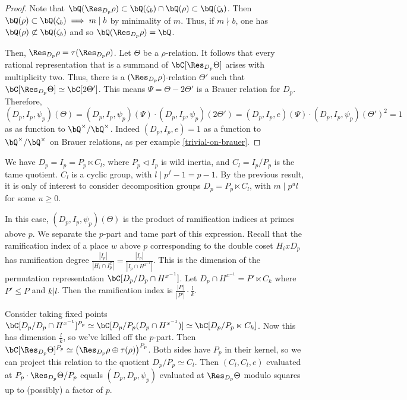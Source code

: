\begin{proof}
    Note that $\bQ(\Res_{D_p}{\rho}) \subset \bQ(\zeta_b) \cap \bQ(\rho) \subset \bQ(\zeta_b)$. Then $\bQ(\rho) \subset \bQ(\zeta_b) \implies m \mid b$ by minimality of $m$. Thus, if $m \nmid b$, one has $\bQ(\rho) \not\subset \bQ(\zeta_b)$ and so $\bQ(\Res_{D_p} \rho) = \bQ$. 

    Then, $\Res_{D_p} \rho = \tau (\Res_{D_p} \rho)$. Let $\Theta$ be a $\rho$-relation. It follows that every rational representation that is a summand of $\bC[\Res_{D_p} \Theta]$ arises with multiplicity two. 
    Thus, there is a $(\Res_{D_p}\rho$)-relation $\Theta ' $ such that $\bC[\Res_{D_p} \Theta] \simeq \bC[2 \Theta']$. This means $\Psi = \Theta - 2 \Theta'$ is a Brauer relation for $D_p$. Therefore, $(D_p, I_p, \psi_p)(\Theta) = (D_p, I_p, \psi_p)(\Psi) \cdot (D_p, I_p, \psi_p)(2 \Theta') = (D_p, I_p, e)(\Psi)  \cdot (D_p, I_p, \psi_p)(\Theta')^2 = 1$ as as function to $\bQ^{\times} / \bQ^{\times}$. Indeed $(D_p, I_p, e) = 1$ as a function to $\bQ^{\times} / \bQ^{\times}$ on Brauer relations, as per example \ref{trivial-on-brauer}.
\end{proof}

We have $D_p = I_p = P_p \ltimes C_l$, where $P_p \triangleleft I_p$ is wild inertia, and $C_l = I_p / P_p$ is the tame quotient. $C_l$ is a cyclic group, with $l \mid p^f - 1 = p - 1$. By the previous result, it is only of interest to consider decomposition groups $D_p = P_p \ltimes C_l$, with $m \mid p^u l$ for some $u \geq 0$. 

In this case, $(D_p, I_p, \psi_p)(\Theta)$ is the product of ramification indices at primes above $p$. We separate the $p$-part and tame part of this expression.
Recall that the ramification index of a place $w$ above $p$ corresponding to the double coset $H_i x D_p$ has ramification degree $\frac{|I_p|}{|H_i \cap I_p^x|} =\frac{|I_p|}{|I_p \cap H^{x^{-1}}|}$.
This is the dimension of the permutation representation $\bC[D_p / D_p \cap H^{x^{-1}}]$.
Let  $D_p \cap H^{x^{-1}} = P' \ltimes C_k$ where $P' \leq P$ and $k | l$. Then the ramification index is $\frac{|P|}{|P'|}\cdot \frac{l}{k}$. 


Consider taking fixed points $\bC[D_p / D_p \cap H^{x^{-1}}]^{P_p} \simeq \bC[D_p / P_p (D_p \cap H^{x^{-1}})] \simeq \bC[D_p / P_p \ltimes C_k]$. Now this has dimension $\frac{l}{k}$, so we've killed off the $p$-part. 
Then $\bC[\Res_{D_p} \Theta]^{P_p} \simeq \left(\Res_{D_p} \rho \oplus \tau(\rho)\right)^{P_p}$. Both sides have $P_p$ in their kernel, so we can project this relation to the quotient $D_p / P_p \simeq C_l$. Then
$(C_l, C_l, e)$ evaluated at $P_p \cdot \Res_{D_p}\Theta / P_p$ equals $(D_p, D_p, \psi_p)$ evaluated at $\Res_{D_p} \Theta$ modulo squares up to (possibly) a factor of $p$.

